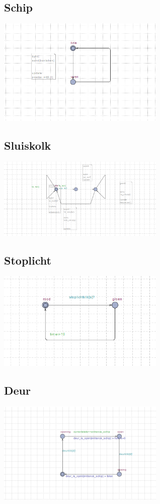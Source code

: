 \documentclass{article}
\begin{document}
	\subsection{Schip}
	\includegraphics[width=8cm]{schip.png} %
	\subsection{Sluiskolk}
	\includegraphics[width=8cm]{sluiskolk.png} %
	\subsection{Stoplicht}
	\includegraphics[width=8cm]{stoplicht.png} %
	\subsection{Deur}	
	\includegraphics[width=8cm]{deur.png} %
\end{document}
